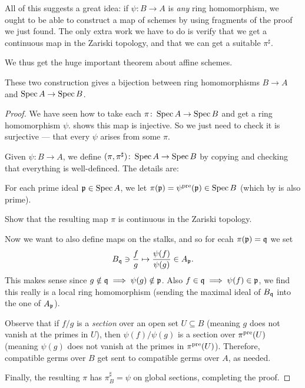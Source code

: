 All of this suggests a great idea:
if $\psi \colon B \to A$ is \emph{any} ring homomorphism,
we ought to be able to construct a map of schemes
by using fragments of the proof we just found.
The only extra work we have to do is verify that
we get a continuous map in the Zariski topology,
and that we can get a suitable $\pi^\sharp$.

We thus get the huge important theorem about affine schemes.
\begin{theorem}
	These two construction gives a bijection between
	ring homomorphisms $B \to A$ and $\operatorname{Spec} A \to \operatorname{Spec} B$.
\end{theorem}
\begin{proof}
	We have seen how to take each
	$\pi \colon \operatorname{Spec} A \to \operatorname{Spec} B$
	and get a ring homomorphism $\psi$.
	 shows this map is injective.
	So we just need to check it is surjective --- that
	every $\psi$ arises from some $\pi$.

	Given $\psi \colon B \to A$, we define
	$(\pi, \pi^\sharp) \colon \operatorname{Spec} A \to \operatorname{Spec} B$
	by copying 
	and checking that everything is well-definced.
	The details are:
	\begin{itemize}
	\ii For each prime ideal $\mathfrak p \in \operatorname{Spec} A$,
	we let $\pi(\mathfrak p) = \psi^{\text{pre}}(\mathfrak p) \in \operatorname{Spec} B$
	(which by  is also prime).
	\begin{exercise}
		Show that the resulting map $\pi$ is continuous
		in the Zariski topology.
	\end{exercise}
	\ii Now we want to also define maps on the stalks,
	and so for ecah $\pi(\mathfrak p) = \mathfrak q$ we set
	\[ B_\mathfrak q \ni \frac fg \mapsto \frac{\psi(f)}{\psi(g)} \in A_\mathfrak p. \]
	This makes sense since $g \notin \mathfrak q \implies \psi(g) \notin \mathfrak p$.
	Also $f \in \mathfrak q \implies \psi(f) \in \mathfrak p$,
	we find this really is a local ring homomorphism
	(sending the maximal ideal of $B_\mathfrak q$ into the one of $A_\mathfrak p$).

	Observe that if $f/g$ is a \emph{section}
	over an open set $U \subseteq B$
	(meaning $g$ does not vanish at the primes in $U$),
	then $\psi(f)/\psi(g)$ is a section over $\pi^{\text{pre}}(U)$
	(meaning $\psi(g)$ does not vanish at the primes in $\pi^{\text{pre}}(U)$).
	Therefore, compatible germs over $B$
	get sent to compatible germs over $A$, as needed.
	\end{itemize}
	Finally, the resulting $\pi$ has $\pi^\sharp_B = \psi$ on global sections,
	completing the proof.
\end{proof}

